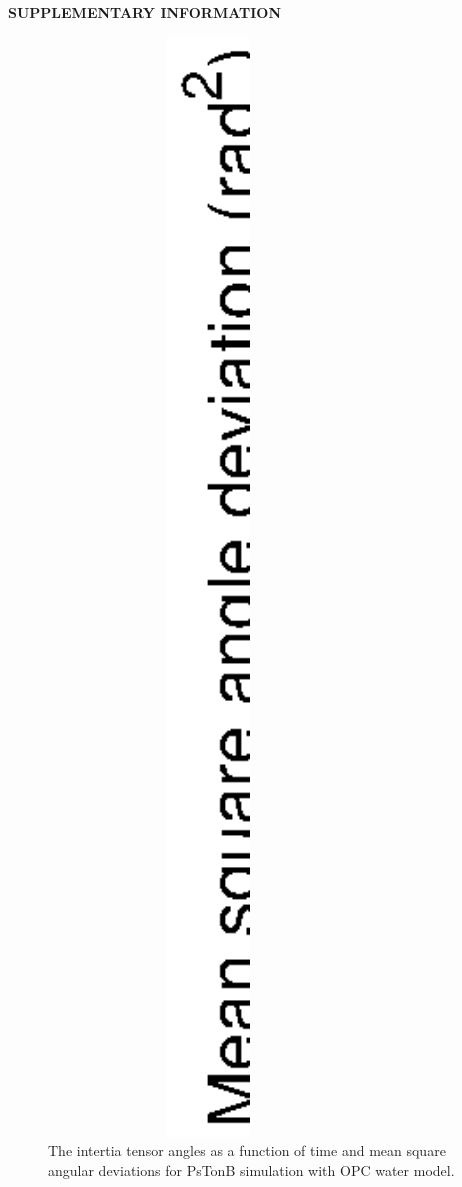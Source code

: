 \documentclass[pre,aps,floatfix,authordate1-4,twocolumn]{revtex4-1}
\begin{document}
\begin{center}
{\bf SUPPLEMENTARY INFORMATION}
\end{center}
\begin{figure}[!h]
  \includegraphics[width=8.5cm]{../Figs/RMASDplotLOG.eps}%
  \caption{The intertia tensor angles as a function of time and mean square angular
    deviations for PsTonB simulation with OPC water model.
    \label{RMASDplotLOG}}%
\end{figure}

\end{document}
